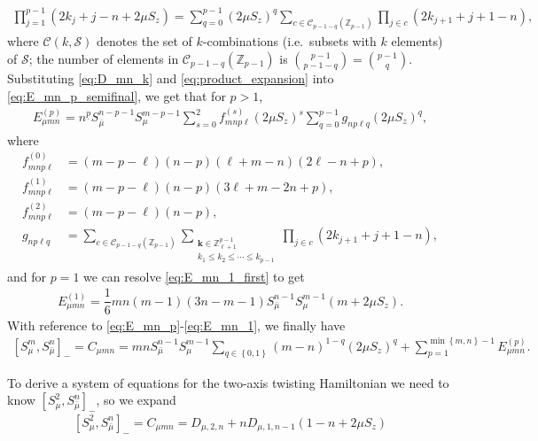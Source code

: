 \documentclass[aps,notitlepage,nofootinbib,11pt]{revtex4-1}
\newcommand{\f}[2]{\dfrac{#1}{#2}} %
\newcommand{\p}[1]{\left(#1\right)} %
\renewcommand{\sp}[1]{\left[#1\right]} %
\renewcommand{\set}[1]{\left\{#1\right\}} %
\renewcommand{\v}{\bm} %
\newcommand{\C}{\mathcal{C}}
\renewcommand{\S}{\mathcal{S}}
\newcommand{\Z}{\mathbb{Z}}
\newcommand{\bmu}{{\bar\mu}}
\newcommand{\1}{\mathds{1}}
\begin{document}
\begin{align}
  \prod_{j=1}^{p-1} \p{2k_j+j-n+2\mu S_z}
  = \sum_{q=0}^{p-1} \p{2\mu S_z}^q
  \sum_{c\in\C_{p-1-q}\p{\Z_{p-1}}} \prod_{j\in c} \p{2k_{j+1}+j+1-n},
  \label{eq:product_expansion}
\end{align}
where $\C\p{k,\S}$ denotes the set of $k$-combinations (i.e.~subsets
with $k$ elements) of $\S$; the number of elements in
$\C_{p-1-q}\p{\Z_{p-1}}$ is
${ p-1 \choose p-1-q } = { p-1 \choose q }$.  Substituting
\eqref{eq:D_mn_k} and \eqref{eq:product_expansion} into
\eqref{eq:E_mn_p_semifinal}, we get that for $p>1$,
\begin{align}
  E_{\mu mn}^{(p)}
  = n^{\underline{p}} S_\bmu^{n-p-1} S_\mu^{m-p-1}
  \sum_{s=0}^2 f_{mnp\ell}^{(s)} \p{2\mu S_z}^s
  \sum_{q=0}^{p-1} g_{np\ell q} \p{2\mu S_z}^q,
  \label{eq:E_mn_p}
\end{align}
where
\begin{align}
  f_{mnp\ell}^{(0)}
  &= \p{m-p-\ell} \p{n-p} \p{\ell+m-n} \p{2\ell-n+p}, \\
  f_{mnp\ell}^{(1)}
  &= \p{m-p-\ell} \p{n-p} \p{3\ell+m-2n+p}, \\
  f_{mnp\ell}^{(2)}
  &= \p{m-p-\ell} \p{n-p}, \\
  g_{np\ell q}
  &=
  \sum_{c\in\C_{p-1-q}\p{\Z_{p-1}}}
  \sum_{\substack{\v k\in\Z_{\ell+1}^{p-1}\\k_1\le k_2\le\cdots\le k_{p-1}}}
  \prod_{j\in c} \p{2k_{j+1}+j+1-n},
\end{align}
and for $p=1$ we can resolve \eqref{eq:E_mn_1_first} to get
\begin{align}
  E_{\mu mn}^{(1)}
  = \f16 mn \p{m-1} \p{3n-m-1} S_\bmu^{n-1} S_\mu ^{m-1} \p{m+2\mu S_z}.
  \label{eq:E_mn_1}
\end{align}
With reference to \eqref{eq:E_mn_p}-\eqref{eq:E_mn_1}, we finally have
\begin{align}
  \sp{S_\mu^m, S_\bmu^n}_-
  = C_{\mu mn}
  = mn S_\bmu^{n-1} S_\mu^{m-1}
  \sum_{q\in\set{0,1}} \p{m-n}^{1-q}\p{2\mu S_z}^q
  + \sum_{p=1}^{\min\set{m,n}-1} E_{\mu mn}^{(p)}.
\end{align}

\vspace{3cm}

To derive a system of equations for the two-axis twisting Hamiltonian
we need to know $\sp{S_\mu^2,S_\bmu^n}_-$, so we expand
\begin{align}
  \sp{S_\mu^2,S_\bmu^n}_-
  = C_{\mu mn}
  = D_{\mu,2,n} + n D_{\mu,1,n-1} \p{1 - n + 2\mu S_z}
\end{align}
\end{document}
